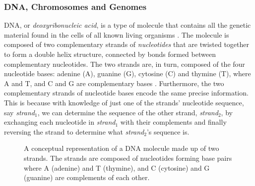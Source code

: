 \subsubsection{DNA, Chromosomes and Genomes} \label{background:biology:dna_chromosomes_and_genomes}

DNA, or \textit{deoxyribonucleic acid}, is a type of molecule that contains all the genetic material found in the cells of all known living organisms \cite{nhgri_dna}. 
The molecule is composed of two complementary strands of \textit{nucleotides} that are twisted together to form a double helix structure, connected by bonds formed between complementary nucleotides.
The two strands are, in turn, composed of the four nucleotide bases: adenine (A), guanine (G), cytosine (C) and thymine (T), where A and T, and C and G are complementary bases \cite[p.15]{singh}.
Furthermore, the two complementary strands of nucleotide bases encode the same precise information.
This is because with knowledge of just one of the strands' nucleotide sequence, say \textit{strand$_1$}, we can determine the sequence of the other strand, \textit{strand$_2$}, by exchanging each nucleotide in \textit{strand$_1$} with their complements and finally reversing the strand to determine what \textit{strand$_2$}'s sequence is.

\begin{figure}[H]
\begin{center}
\caption{A conceptual representation of a DNA molecule made up of two strands. The strands are composed of nucleotides forming base pairs where A (adenine) and T (thymine), and C (cytosine) and G (guanine) are complements of each other.}
\label{background:dna_and_chromosomes:figures:dna_strands}
\end{center}
\end{figure}

